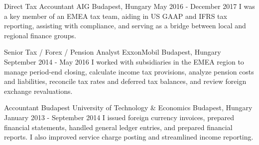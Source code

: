 \begin{cventries}

  \cventry
    {Direct Tax Accountant} %
    {AIG} %
    {Budapest, Hungary} %
    {May 2016 - December 2017} %
    {} %
    {I was a key member of an EMEA tax team, aiding in US GAAP and IFRS tax reporting, assisting with compliance, and serving as a bridge between local and regional finance groups.} %


  \cventry
    {Senior Tax / Forex / Pension Analyst} %
    {ExxonMobil} %
    {Budapest, Hungary} %
    {September 2014 - May 2016} %
    {} %
    {I worked with subsidiaries in the EMEA region to manage period-end closing, calculate income tax provisions, analyze pension costs and liabilities, reconcile tax rates and deferred tax balances, and review foreign exchange revaluations.} %


  \cventry
    {Accountant} %
    {Budapest University of Technology \& Economics} %
    {Budapest, Hungary} %
    {January 2013 - September 2014} %
    {} %
    {I issued foreign currency invoices, prepared financial statements, handled general ledger entries, and prepared financial reports. I also improved service charge posting and streamlined income reporting.} %


\end{cventries}
